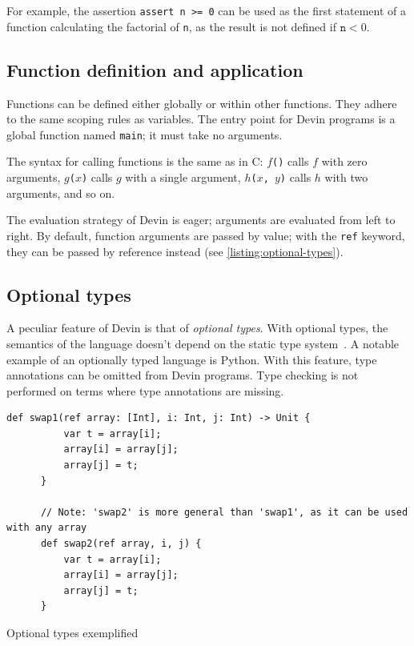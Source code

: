 \documentclass[UdineBachThesis,american,11pt]{PhdThesis}
\begin{document}
  For example, the assertion \mbox{\texttt{assert n >= 0}} can be used as the
  first statement of a function calculating the factorial of \texttt{n}, as the
  result is not defined if \mbox{$\mathtt{n} < 0$}.

  \subsection{Function definition and application}

  Functions can be defined either globally or within other functions. They
  adhere to the same scoping rules as variables. The entry point for Devin
  programs is a global function named \mbox{\texttt{main}}; it must take no
  arguments.

  The syntax for calling functions is the same as in C: \mbox{\texttt{$f$()}}
  calls $f$ with zero arguments, \mbox{\texttt{$g$($x$)}} calls $g$ with a
  single argument, \mbox{\texttt{$h$($x$, $y$)}} calls $h$ with two arguments,
  and so on.

  The evaluation strategy of Devin is eager; arguments are evaluated from left
  to right. By default, function arguments are passed by value; with the
  \mbox{\texttt{ref}} keyword, they can be passed by reference instead (see
  \autoref{listing:optional-types}).

  \subsection{Optional types}

  A peculiar feature of Devin is that of \emph{optional types}. With optional
  types, the semantics of the language doesn't depend on the static type
  system~\cite{pluggable-type-systems}. A notable example of an optionally typed
  language is Python. With this feature, type annotations can be omitted from
  Devin programs. Type checking is not performed on terms where type annotations
  are missing.

  \begin{Listing}[H]
    \begin{Verbatim}[gobble=6,fontsize=\small]
      def swap1(ref array: [Int], i: Int, j: Int) -> Unit {
          var t = array[i];
          array[i] = array[j];
          array[j] = t;
      }

      // Note: 'swap2' is more general than 'swap1', as it can be used with any array
      def swap2(ref array, i, j) {
          var t = array[i];
          array[i] = array[j];
          array[j] = t;
      }
    \end{Verbatim}

    \caption{Optional types exemplified}
    \label{listing:optional-types}
  \end{Listing}
\end{document}
